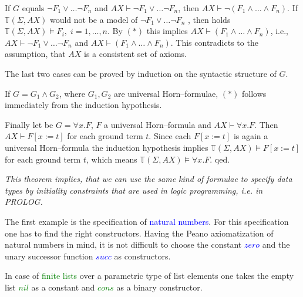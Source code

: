 \documentclass[landscape, autoslides, light]{mmiss}
\newcommand{\ns}{\normalsize}
\begin{document}
\begin{Package}[Label={FSDPT}, Title={Formal Specification of Data and Process Types}, ShortTitle={FSDPT}, Authors={Horst Reichel}, Date={February 2003}, LevelOfDetail=Lecture, Language=en-GB]
\begin{Section}[Title={Initial Algebras as Data Types}, Label={section3}]
\begin{Section}[Title={Existence of initial models}, Label={section3_1}]
\begin{Paragraph}[Label=Paragraph41]
If $G$ equals $\neg F_1 \vee \ldots \neg F_n$ and $AX \vdash \neg
F_1 \vee \ldots \neg F_n$, then $AX \vdash \neg (F_1 \wedge \ldots
\wedge F_n)$. If $\mathbb{T}(\Sigma,AX)$ would not be a model of
$\neg F_1 \vee \ldots \neg F_n$ , then holds
$\mathbb{T}(\Sigma,AX) \vDash F_i, \; i = 1, \ldots , n.$ By $(*)$
this implies $AX \vdash (F_1 \wedge \ldots \wedge F_n)$, i.e., $AX
\vdash \neg F_1 \vee \ldots \neg F_n$ and $AX \vdash (F_1 \wedge
\ldots \wedge F_n)$. This contradicts to the assumption, that $AX$
is a consistent set of axioms.

The last two cases can be proved by induction on the syntactic
structure of $G$.

If $G = G_1 \wedge G_2$, where $G_1, G_2$ are universal
Horn--formulae, $(*)$ follows immediately from the induction
hypothesis.

Finally let be $G = \forall x . F$, $F$ a universal Horn--formula
and $AX \vdash \forall x . F$. Then $AX \vdash F[x := t]$ for each
ground term $t$. Since each $F[x := t]$ is again a universal
Horn--formula  the induction hypothesis implies
$\mathbb{T}(\Sigma,AX) \vDash F[x := t]$ for each ground term $t$,
which means $\mathbb{T}(\Sigma,AX) \vDash \forall x . F$. \hfill
qed.

\emph{This theorem implies, that we can use the same kind of
formulae to specify  data types by initiality constraints that are
used in logic programming, i.e. in PROLOG.}

\end{Paragraph}
\end{Section}
\begin{Section}[Title={Initial Specifications of Data Types}, Label={section3_2}]
\begin{Paragraph}


\end{Paragraph}
\begin{Paragraph}[Title={Examples}, Label=Paragraph42]

\ns The first example is the specification of
\textcolor{blue}{natural numbers}. For this specification one has
to find the right constructors. Having the Peano axiomatization of
natural numbers in mind, it is not difficult to choose the
constant \textcolor{blue}{$zero$} and the unary successor function
\textcolor{blue}{$succ$} as constructors.

In case of \textcolor{green}{finite lists} over a parametric type
of list elements one takes the empty list \textcolor{green}{$nil$}
as a constant and \textcolor{green}{$cons$} as a binary
constructor.


\end{Paragraph}
\end{Section}
\end{Section}
\end{Package}
\end{document}
